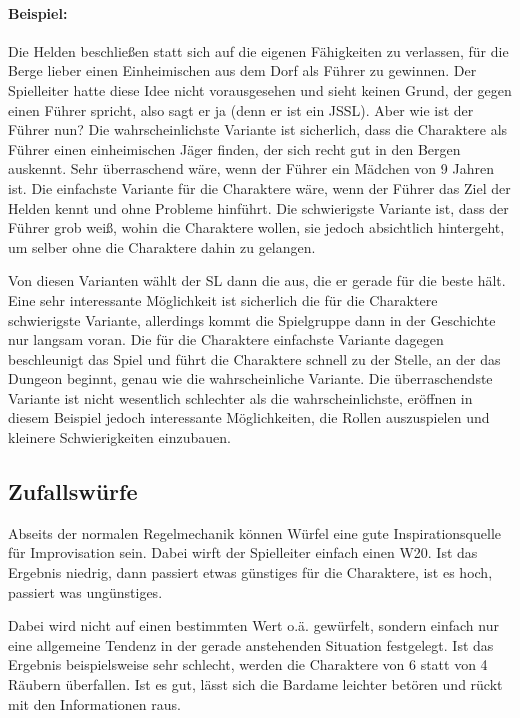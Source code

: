 \begin{beispiel}
\paragraph{Beispiel:} Die Helden beschließen statt sich auf die eigenen Fähigkeiten zu
verlassen, für die Berge lieber einen Einheimischen aus dem Dorf als Führer zu
gewinnen. Der Spielleiter hatte diese Idee nicht vorausgesehen und sieht keinen
Grund, der gegen einen Führer spricht, also sagt er ja (denn er ist ein JSSL).
Aber wie ist der Führer nun? Die wahrscheinlichste Variante ist sicherlich,
dass die Charaktere als Führer einen einheimischen Jäger finden, der sich recht
gut in den Bergen auskennt. Sehr überraschend wäre, wenn der Führer ein
Mädchen von 9 Jahren ist. Die einfachste Variante für die Charaktere wäre, wenn der
Führer das Ziel der Helden kennt und ohne Probleme hinführt. Die schwierigste
Variante ist, dass der Führer grob weiß, wohin die Charaktere wollen, sie
jedoch absichtlich hintergeht, um selber ohne die Charaktere dahin zu gelangen.

Von diesen Varianten wählt der SL dann die aus, die er gerade für die beste
hält. Eine sehr interessante Möglichkeit ist sicherlich die für die Charaktere
schwierigste Variante, allerdings kommt die Spielgruppe dann in der Geschichte nur
langsam voran. Die für die Charaktere einfachste Variante dagegen beschleunigt das
Spiel und führt die Charaktere schnell zu der Stelle, an der das Dungeon
beginnt, genau wie die wahrscheinliche Variante. Die überraschendste Variante
ist nicht wesentlich schlechter als die wahrscheinlichste, eröffnen in diesem 
Beispiel jedoch interessante Möglichkeiten, die Rollen auszuspielen und kleinere
Schwierigkeiten einzubauen.
\end{beispiel}

\subsection{Zufallswürfe}

Abseits der normalen Regelmechanik können Würfel eine gute Inspirationsquelle
für Improvisation sein. Dabei wirft der Spielleiter einfach einen W20.
Ist das Ergebnis niedrig, dann passiert etwas günstiges für
die Charaktere, ist es hoch, passiert was ungünstiges.

Dabei wird nicht auf einen bestimmten Wert o.ä. gewürfelt, sondern einfach nur
eine allgemeine Tendenz in der gerade anstehenden Situation festgelegt. Ist das
Ergebnis beispielsweise sehr schlecht, werden die Charaktere von 6 statt von 4
Räubern überfallen. Ist es gut, lässt sich die Bardame leichter betören und
rückt mit den Informationen raus.

